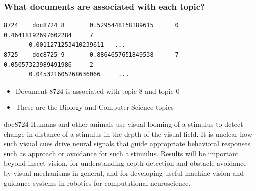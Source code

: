 \begin{frame}[fragile]
  \frametitle{What documents are associated with each topic?}

  \begin{lstlisting}
8724    doc8724 8       0.5295448158189615      0       0.46418192697602284     7
       0.0011271253410239611   ...
8725    doc8725 9       0.8864657651849538      7       0.05057323989491986     2
       0.045321605268636066     ...
        \end{lstlisting}

    \begin{itemize}
      \item Document 8724 is associated with topic 8 and topic 0
        \item These are the Biology and Computer Science topics
      \end{itemize}

      \pause

      \vspace{-3cm}

  \begin{block}{doc8724}
    \small
Humans and other animals use visual  looming  of a stimulus to detect change in distance of a stimulus in the depth of the visual field. It is unclear how such visual cues drive neural signals that guide appropriate behavioral responses such as approach or avoidance for such a stimulus. Results will be important beyond insect vision, for understanding depth detection and obstacle avoidance by visual mechanisms in general, and for developing useful machine vision and guidance systems in robotics for computational neuroscience.
  \end{block}

\end{frame}


